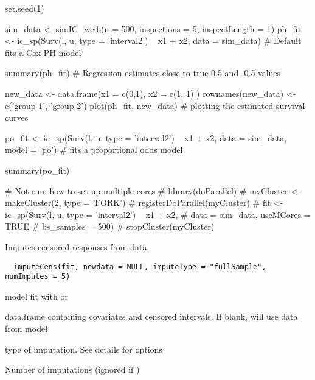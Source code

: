 \documentclass[a4paper]{book}
\begin{document}
%
\begin{Examples}
\begin{ExampleCode}
	set.seed(1)

	sim_data <- simIC_weib(n = 500, inspections = 5, inspectLength = 1)
	ph_fit <- ic_sp(Surv(l, u, type = 'interval2') ~ x1 + x2, data = sim_data)	
	# Default fits a Cox-PH model
	
	summary(ph_fit)		
	# Regression estimates close to true 0.5 and -0.5 values


	new_data <- data.frame(x1 = c(0,1), x2 = c(1, 1) )
	rownames(new_data) <- c('group 1', 'group 2')
	plot(ph_fit, new_data)
	# plotting the estimated survival curves

	po_fit <- ic_sp(Surv(l, u, type = 'interval2') ~ x1 + x2, data = sim_data,
	                model = 'po')
	# fits a proportional odds model
	
	summary(po_fit)
	
	# Not run: how to set up multiple cores
	# library(doParallel)
	# myCluster <- makeCluster(2, type = 'FORK') 
	# registerDoParallel(myCluster)
	# fit <- ic_sp(Surv(l, u, type = 'interval2') ~ x1 + x2,
	#              data = sim_data, useMCores = TRUE
	#              bs_samples = 500)
	# stopCluster(myCluster)
\end{ExampleCode}
\end{Examples}
%
\begin{Description}\relax
 
Imputes censored responses from data. 
\end{Description}
%
\begin{Usage}
\begin{verbatim}
  imputeCens(fit, newdata = NULL, imputeType = "fullSample", numImputes = 5)
\end{verbatim}
\end{Usage}
%
\begin{Arguments}
\begin{ldescription}
\item[\code{fit}] model fit with  or 
\item[\code{newdata}] data.frame containing covariates and censored intervals. If blank, will use data from model
\item[\code{imputeType}] type of imputation. See details for options
\item[\code{numImputes}] Number of imputations (ignored if ) 
\end{ldescription}
\end{Arguments}
\end{document}
